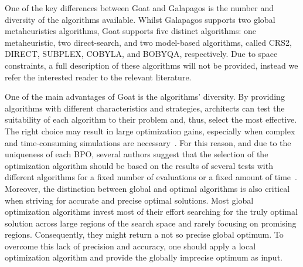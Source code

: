 	
	
	One of the key differences between Goat and Galapagos is the number and diversity of the algorithms available. Whilst Galapagos supports two global metaheuristics algorithms, Goat supports five distinct algorithms: one metaheuristic, two direct-search, and two model-based algorithms, called CRS2, DIRECT, SUBPLEX, COBYLA, and BOBYQA, respectively. Due to space constraints, a full description of these algorithms will not be provided, instead we refer the interested reader to the relevant literature.  
	
	One of the main advantages of Goat is the algorithms' diversity. By providing algorithms with different characteristics and strategies, architects can test the suitability of each algorithm to their problem and, thus, select the most effective. The right choice may result in large optimization gains, especially when complex and time-consuming simulations are necessary~\cite{Wortmann2016BBO}. For this reason, and due to the uniqueness of each \ac{BPO}, several authors suggest that the selection of the optimization algorithm should be based on the results of several tests with different algorithms for a fixed number of evaluations or a fixed amount of time~\cite{Hamdy2016,Wortmann2016BBO}. Moreover, the distinction between global and optimal algorithms is also critical when striving for accurate and precise optimal solutions. Most global optimization algorithms invest most of their effort searching for the truly optimal solution across large regions of the search space and rarely focusing on promising regions. Consequently, they might return a not so precise global optimum. To overcome this lack of precision and accuracy, one should apply a local optimization algorithm and provide the globally imprecise optimum as input.
	
	
	
	
	
	
	
